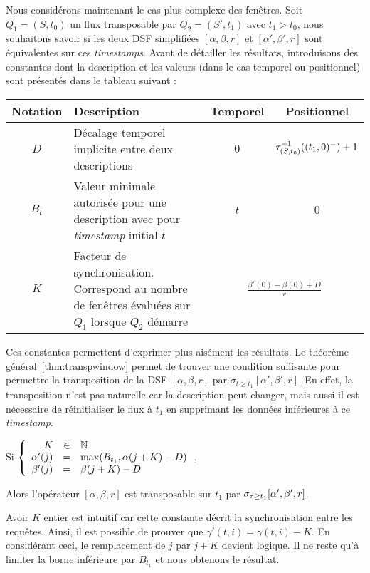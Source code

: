 Nous considérons maintenant le cas plus complexe des fenêtres. Soit $Q_1=(S,t_0)$ un flux transposable par $Q_2=(S',t_1)$ avec $t_1 > t_0$, nous souhaitons savoir si les deux DSF simplifiées $[\alpha,\beta,r]$ et $[\alpha',\beta',r]$ sont équivalentes sur ces \textit{timestamps}. Avant de détailler les résultats, introduisons des constantes dont la description et les valeurs (dans le cas temporel ou positionnel) sont présentés dans le tableau suivant :

\noindent\begin{tabularx}{\linewidth}{|c|X|c|c|} \bottomrule
\rowcolor{hypcolor}     Notation & Description & Temporel & Positionnel\\ \hline
    $D$ & Décalage temporel implicite entre deux descriptions & $0$ & $\tau^{-1}_{(S,t_0)} ((t_1,0)^-)+1$ \\\hline
    $B_t$ & Valeur minimale autorisée pour une description avec pour \textit{timestamp} initial $t$ & $t$ & $0$ \\ \hline
    $K$ & Facteur de synchronisation. Correspond au nombre de fenêtres évaluées sur $Q_1$ lorsque $Q_2$ démarre & \multicolumn{2}{c|}{$\displaystyle\frac{\beta'(0)-\beta(0)+D}{r}$} \\ \toprule
\end{tabularx}

Ces constantes permettent d'exprimer plus aisément les résultats. Le théorème général~\ref{thm:transpwindow} permet de trouver une condition suffisante pour permettre la transposition de la DSF $[\alpha,\beta,r]$ par $\sigma_{t\geq t_1} [\alpha',\beta',r]$. En effet, la transposition n'est pas naturelle car la description peut changer, mais aussi il est nécessaire de réinitialiser le flux à $t_1$ en supprimant les données inférieures à ce \textit{timestamp}.
\begin{thm}\label{thm:transpwindow}
    Si $\left\{\begin{array}{rcl} K &\in& \mathbb{N} \\\alpha'(j) &=& \max(B_{t_1}, \alpha(j+K)-D)\\ \beta'(j) &=&  \beta(j+K)-D \end{array}\right.$,

    Alors l'opérateur $[\alpha,\beta,r]$ est transposable sur $t_1$ par $\sigma_{\tau\geq t_1} [\alpha',\beta',r]$.
\end{thm}

Avoir $K$ entier est intuitif car cette constante décrit la synchronisation entre les requêtes. Ainsi, il est possible de prouver que $\gamma'(t,i) = \gamma(t,i) - K$. En considérant ceci, le remplacement de $j$ par $j+K$ devient logique. Il ne reste qu'à limiter la borne inférieure par $B_{t_1}$ et nous obtenons le résultat.

